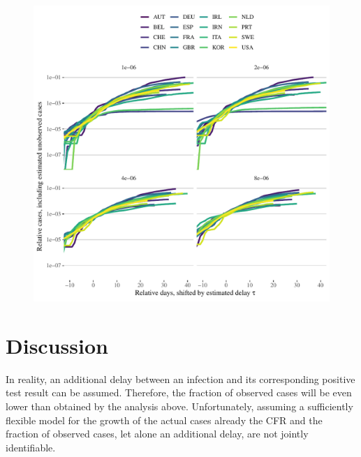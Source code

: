 \documentclass[fullpage,a4paper]{article}
\begin{document}
\begin{figure}
  \includegraphics[width=1\textwidth]{../figs/ecdc_aligned_case_est.pdf}
  \caption{\label{fig:aligned_case_est}}
\end{figure}

\section{Discussion}

In reality, an additional delay between an infection and its
corresponding positive test result can be assumed. Therefore, the
fraction of observed cases will be even lower than obtained by the
analysis above. Unfortunately, assuming a sufficiently flexible model
for the growth of the actual cases already the CFR and the fraction of
observed cases, let alone an additional delay, are not jointly
identifiable.
\end{document}
